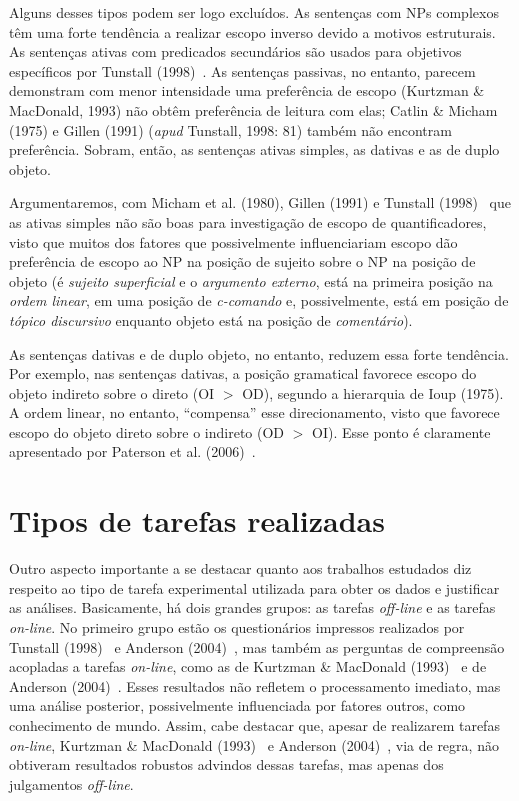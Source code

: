 Alguns desses tipos podem ser logo excluídos. As sentenças com NPs complexos têm uma forte tendência a realizar escopo inverso devido a motivos estruturais. As sentenças ativas com predicados secundários são usados para objetivos específicos por Tunstall (1998)~\cite{Tunstall1998}. As sentenças passivas, no entanto, parecem demonstram com menor intensidade uma preferência de escopo (Kurtzman \& MacDonald, 1993) não obtêm preferência de leitura com elas; Catlin \& Micham (1975) e Gillen (1991) (\emph{apud} Tunstall, 1998: 81) também não encontram preferência. Sobram, então, as sentenças ativas simples, as dativas e as de duplo objeto.

Argumentaremos, com Micham et al. (1980), Gillen (1991) e Tunstall (1998)~\cite{Tunstall1998} que as ativas simples não são boas para investigação de escopo de quantificadores, visto que muitos dos fatores que possivelmente influenciariam escopo dão preferência de escopo ao NP na posição de sujeito sobre o NP na posição de objeto (é \emph{sujeito superficial} e o \emph{argumento externo}, está na primeira posição na \emph{ordem linear}, em uma posição de \emph{c-comando} e, possivelmente, está em posição de \emph{tópico discursivo} enquanto objeto está na posição de \emph{comentário}).

As sentenças dativas e de duplo objeto, no entanto, reduzem essa forte tendência. Por exemplo, nas sentenças dativas, a posição gramatical favorece escopo do objeto indireto sobre o direto (OI $>$ OD), segundo a hierarquia de Ioup (1975). A ordem linear, no entanto, ``compensa'' esse direcionamento, visto que favorece escopo do objeto direto sobre o indireto (OD $>$ OI). Esse ponto é claramente apresentado por Paterson et al. (2006)~\cite{paterson2007}.

\section{Tipos de tarefas realizadas}
Outro aspecto importante a se destacar quanto aos trabalhos estudados diz respeito ao tipo de tarefa experimental utilizada para obter os dados e justificar as análises. Basicamente, há dois grandes grupos: as tarefas \emph{off-line} e as tarefas \emph{on-line}. No primeiro grupo estão os questionários impressos realizados por Tunstall (1998)~\cite{Tunstall1998} e Anderson (2004)~\cite{Anderson2004}, mas também as perguntas de compreensão acopladas a tarefas \emph{on-line}, como as de Kurtzman \& MacDonald (1993)~\cite{KMac1993} e de Anderson (2004)~\cite{Anderson2004}. Esses resultados não refletem o processamento imediato, mas uma análise posterior, possivelmente influenciada por fatores outros, como conhecimento de mundo. Assim, cabe destacar que, apesar de realizarem tarefas \emph{on-line}, Kurtzman \& MacDonald (1993)~\cite{KMac1993} e Anderson (2004)~\cite{Anderson2004}, via de regra, não obtiveram resultados robustos advindos dessas tarefas, mas apenas dos julgamentos \emph{off-line}.

